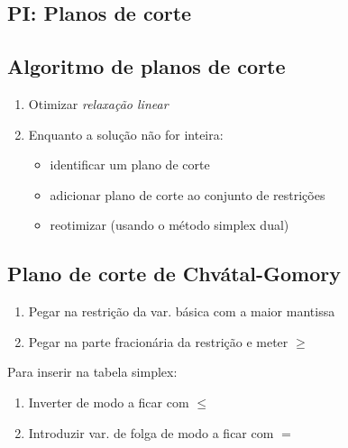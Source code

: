 \documentclass[10pt, a4paper]{article}
\begin{document}
\begin{multicols}{2}
\section{PI: Planos de corte}


\subsection{Algoritmo de planos de corte}

\begin{enumerate}
    \item Otimizar \textit{relaxação linear}
    \item Enquanto a solução não for inteira:
    \begin{itemize}
        \item identificar um plano de corte
        \item adicionar plano de corte ao conjunto de restrições
        \item reotimizar (usando o método simplex dual)
    \end{itemize}
\end{enumerate}

\subsection{Plano de corte de Chvátal-Gomory}

\begin{enumerate}
    \item Pegar na restrição da var. básica com a maior mantissa
    \item Pegar na parte fracionária da restrição e meter \(\ge\)
\end{enumerate}

\vspace{3mm}

Para inserir na tabela simplex:
\begin{enumerate}
    \item Inverter de modo a ficar com \(\le\)
    \item Introduzir var. de folga de modo a ficar com \(=\)
\end{enumerate}


\end{multicols}
\end{document}
